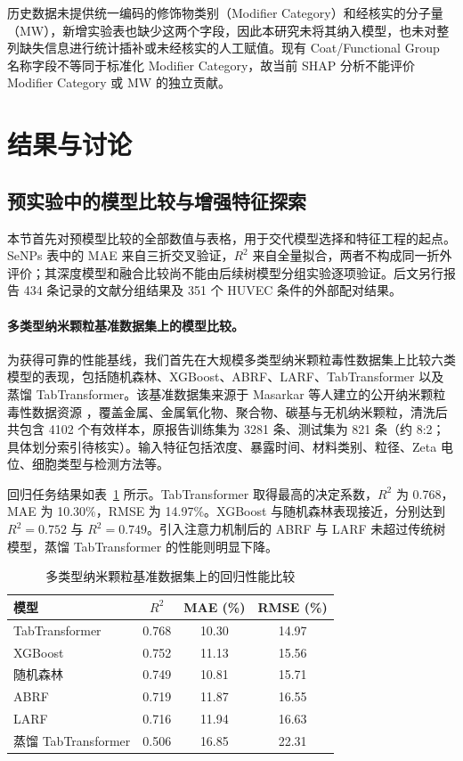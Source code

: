 \documentclass[letterpaper]{article}
\begin{document}
历史数据未提供统一编码的修饰物类别（Modifier Category）和经核实的分子量（MW），新增实验表也缺少这两个字段，因此本研究未将其纳入模型，也未对整列缺失信息进行统计插补或未经核实的人工赋值。现有 Coat/Functional Group 名称字段不等同于标准化 Modifier Category，故当前 SHAP 分析不能评价 Modifier Category 或 MW 的独立贡献。

\section{结果与讨论}

\subsection{预实验中的模型比较与增强特征探索}

本节首先对预模型比较的全部数值与表格，用于交代模型选择和特征工程的起点。SeNPs 表中的 MAE 来自三折交叉验证，$R^2$ 来自全量拟合，两者不构成同一折外评价；其深度模型和融合比较尚不能由后续树模型分组实验逐项验证。后文另行报告 434 条记录的文献分组结果及 351 个 HUVEC 条件的外部配对结果。


\paragraph{多类型纳米颗粒基准数据集上的模型比较。}
为获得可靠的性能基线，我们首先在大规模多类型纳米颗粒毒性数据集上比较六类模型的表现，包括随机森林\cite{breiman2001random}、XGBoost\cite{chen2016xgboost}、ABRF\cite{gromov2022attention}、LARF\cite{gromov2022larf}、TabTransformer\cite{huang2020tabtransformer} 以及蒸馏 TabTransformer\cite{hinton2015distilling}。该基准数据集来源于 Masarkar 等人建立的公开纳米颗粒毒性数据资源 \cite{masarkar2024}，覆盖金属、金属氧化物、聚合物、碳基与无机纳米颗粒，清洗后共包含 4102 个有效样本，原报告训练集为 3281 条、测试集为 821 条（约 8:2；具体划分索引待核实）。输入特征包括浓度、暴露时间、材料类别、粒径、Zeta 电位、细胞类型与检测方法等。

回归任务结果如表~\ref{tab:benchmark_regression} 所示。TabTransformer 取得最高的决定系数，$R^2$ 为 0.768，MAE 为 10.30\%，RMSE 为 14.97\%。XGBoost 与随机森林表现接近，分别达到 $R^2=0.752$ 与 $R^2=0.749$。引入注意力机制后的 ABRF 与 LARF 未超过传统树模型，蒸馏 TabTransformer 的性能则明显下降。

\begin{table}[htbp]
  \centering
  \caption{多类型纳米颗粒基准数据集上的回归性能比较}
  \label{tab:benchmark_regression}
  \begin{tabular}{lccc}
    \hline
    模型 & $R^2$ & MAE (\%) & RMSE (\%) \\
    \hline
    TabTransformer & 0.768 & 10.30 & 14.97 \\
    XGBoost & 0.752 & 11.13 & 15.56 \\
    随机森林 & 0.749 & 10.81 & 15.71 \\
    ABRF & 0.719 & 11.87 & 16.55 \\
    LARF & 0.716 & 11.94 & 16.63 \\
    蒸馏 TabTransformer & 0.506 & 16.85 & 22.31 \\
    \hline
  \end{tabular}
\end{table}
\end{document}
